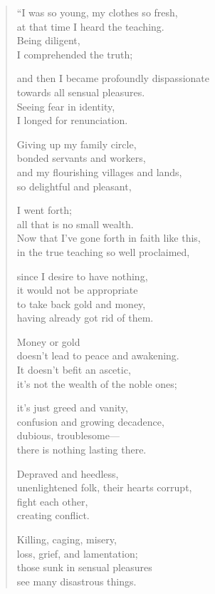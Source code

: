 \documentclass[12pt,openany]{book}%
\begin{document}
\begin{verse}%
“I was so young, my clothes so fresh, \\
at that time I heard the teaching. \\
Being diligent, \\
I comprehended the truth; 

and then I became profoundly dispassionate \\
towards all sensual pleasures. \\
Seeing fear in identity, \\
I longed for renunciation. 

Giving up my family circle, \\
bonded servants and workers, \\
and my flourishing villages and lands, \\
so delightful and pleasant, 

I went forth; \\
all that is no small wealth. \\
Now that I’ve gone forth in faith like this, \\
in the true teaching so well proclaimed, 

since I desire to have nothing, \\
it would not be appropriate \\
to take back gold and money, \\
having already got rid of them. 

Money or gold \\
doesn’t lead to peace and awakening. \\
It doesn’t befit an ascetic, \\
it’s not the wealth of the noble ones; 

it’s just greed and vanity, \\
confusion and growing decadence, \\
dubious, troublesome—\\
there is nothing lasting there. 

Depraved and heedless, \\
unenlightened folk, their hearts corrupt, \\
fight each other, \\
creating conflict. 

Killing, caging, misery, \\
loss, grief, and lamentation; \\
those sunk in sensual pleasures \\
see many disastrous things. 


\end{verse}
\end{document}
